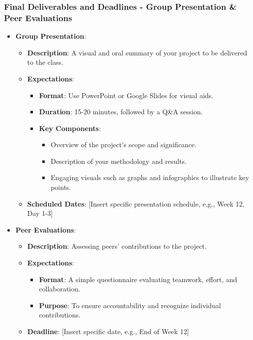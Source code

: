 \documentclass[aspectratio=169]{beamer}
\begin{document}
\begin{frame}[fragile]
    \frametitle{Final Deliverables and Deadlines - Group Presentation & Peer Evaluations}
    \begin{itemize}
        \item \textbf{Group Presentation}:
        \begin{itemize}
            \item \textbf{Description}: A visual and oral summary of your project to be delivered to the class.
            \item \textbf{Expectations}:
            \begin{itemize}
                \item \textbf{Format}: Use PowerPoint or Google Slides for visual aids.
                \item \textbf{Duration}: 15-20 minutes, followed by a Q\&A session.
                \item \textbf{Key Components}:
                \begin{itemize}
                    \item Overview of the project’s scope and significance.
                    \item Description of your methodology and results.
                    \item Engaging visuals such as graphs and infographics to illustrate key points.
                \end{itemize}
            \end{itemize}
            \item \textbf{Scheduled Dates}: [Insert specific presentation schedule, e.g., Week 12, Day 1-3]
        \end{itemize}
        
        \item \textbf{Peer Evaluations}:
        \begin{itemize}
            \item \textbf{Description}: Assessing peers’ contributions to the project.
            \item \textbf{Expectations}:
            \begin{itemize}
                \item \textbf{Format}: A simple questionnaire evaluating teamwork, effort, and collaboration.
                \item \textbf{Purpose}: To ensure accountability and recognize individual contributions.
            \end{itemize}
            \item \textbf{Deadline}: [Insert specific date, e.g., End of Week 12]
        \end{itemize}
    \end{itemize}
\end{frame}
\end{document}
